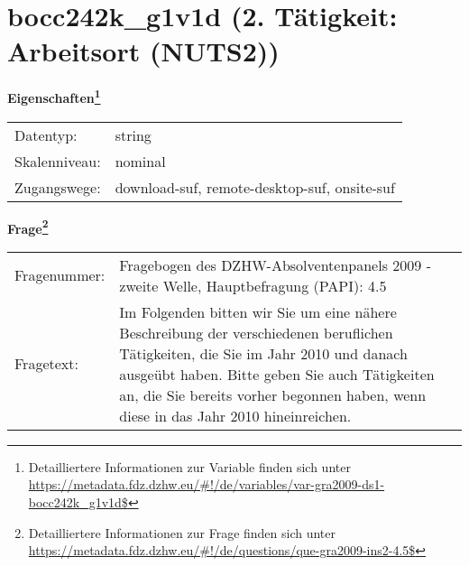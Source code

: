 
    \setcounter{footnote}{0}

    \vspace*{-1.8cm}
	\section{bocc242k\_g1v1d (2. Tätigkeit: Arbeitsort (NUTS2))}
	\label{section:bocc242k_g1v1d}



    \vspace*{0.5cm}
    \noindent\textbf{Eigenschaften\footnote{Detailliertere Informationen zur Variable finden sich unter
		\url{https://metadata.fdz.dzhw.eu/\#!/de/variables/var-gra2009-ds1-bocc242k_g1v1d$}}}\\
	\begin{tabularx}{\hsize}{@{}lX}
	Datentyp: & string \\
	Skalenniveau: & nominal \\
	Zugangswege: &
	  download-suf, 
	  remote-desktop-suf, 
	  onsite-suf
 \\
    \end{tabularx}



				\vspace*{0.5cm}
                \noindent\textbf{Frage\footnote{Detailliertere Informationen zur Frage finden sich unter
		              \url{https://metadata.fdz.dzhw.eu/\#!/de/questions/que-gra2009-ins2-4.5$}}}\\
				\begin{tabularx}{\hsize}{@{}lX}
					Fragenummer: &
					  Fragebogen des DZHW-Absolventenpanels 2009 - zweite Welle, Hauptbefragung (PAPI):
					  4.5
 \\
					Fragetext: & Im Folgenden bitten wir Sie um eine nähere Beschreibung der verschiedenen beruflichen Tätigkeiten, die Sie im Jahr 2010 und danach ausgeübt haben. Bitte geben Sie auch Tätigkeiten an, die Sie bereits vorher begonnen haben, wenn diese in das Jahr 2010 hineinreichen. \\
				\end{tabularx}





